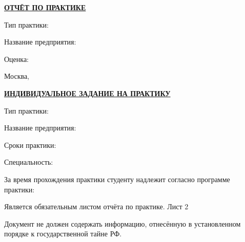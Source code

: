 \leavevmode\titletitle

\begin{center}
    \fontsize{18}{18}\selectfont
    \textbf{\underline{ОТЧЁТ ПО \MakeUppercase{\practicekind} ПРАКТИКЕ}}
\end{center}

\text{}

\begin{justify}
    \fontsize{12}{12}\selectfont

    \noindent
    Тип практики: \practicetype

    \noindent
    Название предприятия: \practicefacility
\end{justify}

\vfill

\titlestudenttable

\text{}

\begin{justify}
    \noindent\fontsize{12}{12}\selectfont
    Оценка: \placeholder
\end{justify}

\text{}

\text{}

\text{}

\begin{center}
    \fontsize{12}{12}\selectfont

    Москва, \year
\end{center}

\thispagestyle{empty}


\newpage
\clearpage
\thispagestyle{empty}
\titletitle

\begin{center}
    \fontsize{18}{18}\selectfont
    \textbf{\underline{ИНДИВИДУАЛЬНОЕ ЗАДАНИЕ НА ПРАКТИКУ}}
\end{center}

\begin{justify}
    \fontsize{12}{12}\selectfont
    \noindent
    Тип практики: \practicetype

    \noindent
    Название предприятия: \practicefacility

    \noindent
    Сроки практики: \practiceduration

    \noindent
    Специальность: \practicespec

\end{justify}

\begin{justify}
    \fontsize{12}{12}\selectfont
    За время прохождения практики студенту надлежит согласно программе практики:

    \practicetasks
\end{justify}

\minussingle
\titlestudenttable

\vfill

\begin{justify}
    \fontsize{10}{10}\selectfont
    \noindent Является обязательным листом отчёта по практике. Лист 2

    \noindent Документ не должен содержать информацию, отнесённую в установленном порядке к государственной тайне РФ.
\end{justify}

\newpage
